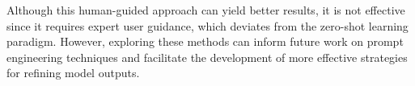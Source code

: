 Although this human-guided approach can yield better results, it is not effective since it requires expert user guidance, which deviates from the zero-shot learning paradigm. However, exploring these methods can inform future work on prompt engineering techniques and facilitate the development of more effective strategies for refining model outputs.